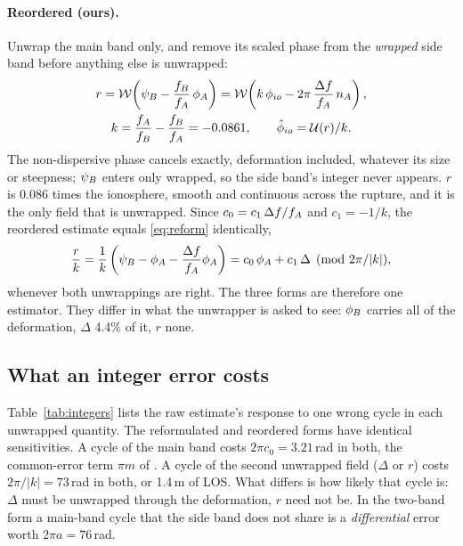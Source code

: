 \paragraph{Reordered (ours).} Unwrap the main band only, and remove its scaled phase from the \emph{wrapped} side band
before anything else is unwrapped:
\begin{equation}
  \begin{gathered}
  r = \mathcal{W}\!\left(\psi_B - \frac{f_B}{f_A}\,\phi_A\right) = \mathcal{W}\!\left(k\,\phi_{io} - 2\pi\,\frac{\Delta f}{f_A}\,n_A\right),\\
  k = \frac{f_A}{f_B} - \frac{f_B}{f_A} = -0.0861, \qquad \hat\phi_{io} = \mathcal{U}(r)/k .
  \end{gathered}
  \label{eq:ours}
\end{equation}
The non-dispersive phase cancels exactly, deformation included, whatever its size or steepness; $\psi_B$ enters only
wrapped, so the side band's integer never appears. $r$ is $0.086$ times the ionosphere, smooth and continuous across
the rupture, and it is the only field that is unwrapped. Since $c_0 = c_1\,\Delta f/f_A$ and $c_1 = -1/k$, the
reordered estimate equals \eqref{eq:reform} identically,
\begin{equation}
  \frac{r}{k} = \frac{1}{k}\left(\psi_B - \phi_A - \frac{\Delta f}{f_A}\phi_A\right) = c_0\,\phi_A + c_1\,\Delta
  \pmod{2\pi/|k|},
\end{equation}
whenever both unwrappings are right. The three forms are therefore one estimator. They differ in what the unwrapper
is asked to see: $\phi_B$ carries all of the deformation, $\Delta$ 4.4\% of it, $r$ none.

\subsection{What an integer error costs}
Table~\ref{tab:integers} lists the raw estimate's response to one wrong cycle in each unwrapped quantity. The
reformulated and reordered forms have identical sensitivities. A cycle of the main band costs $2\pi c_0 =
3.21$\,rad in both, the common-error term $\pi m$ of \citet[their eq.~25]{gomba2016toward}. A cycle of the
second unwrapped field ($\Delta$ or $r$) costs $2\pi/|k| = 73$\,rad in both, or 1.4\,m of LOS. What differs is how
likely that cycle is: $\Delta$ must be unwrapped through the deformation, $r$ need not be. In the two-band form a
main-band cycle that the side band does not share is a \emph{differential} error worth $2\pi a = 76$\,rad.

